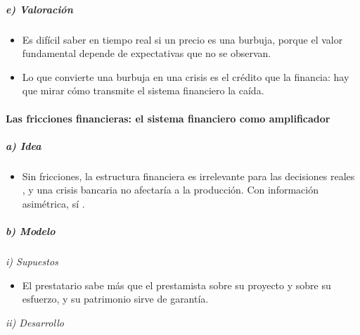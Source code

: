 \documentclass[11pt]{article}
\begin{document}
\subparagraph{e) Valoración}

\begin{itemize}
\item Es difícil saber en tiempo real si un precio es una burbuja, porque el valor fundamental depende de expectativas que no se observan.
\item Lo que convierte una burbuja en una crisis es el crédito que la financia: hay que mirar cómo transmite el sistema financiero la caída.
\end{itemize}

\paragraph{Las fricciones financieras: el sistema financiero como amplificador}

\subparagraph{a) Idea}

\begin{itemize}
\item Sin fricciones, la estructura financiera es irrelevante para las decisiones reales , y una crisis bancaria no afectaría a la producción. Con información asimétrica, sí .
\end{itemize}

\subparagraph{b) Modelo}

\hspace*{3.6em}\emph{i) Supuestos}

\begin{itemize}
\item El prestatario sabe más que el prestamista sobre su proyecto y sobre su esfuerzo, y su patrimonio sirve de garantía.
\end{itemize}

\hspace*{3.6em}\emph{ii) Desarrollo}
\end{document}
